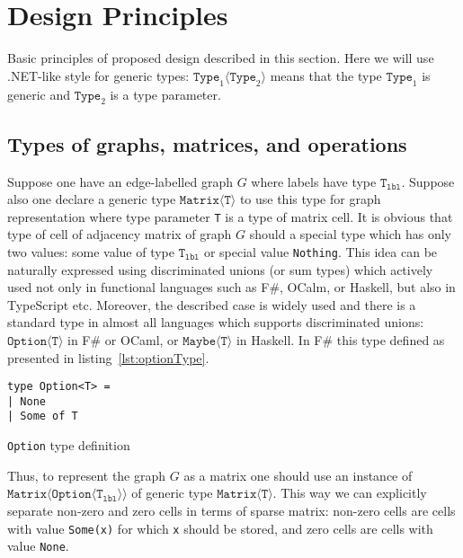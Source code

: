 \section{Design Principles}

Basic principles of proposed design described in this section.
Here we will use .NET-like style for generic types: $\texttt{Type}_1\langle\texttt{Type}_2\rangle$ means that the type $\texttt{Type}_1$ is generic and $\texttt{Type}_2$ is a type parameter.

\subsection{Types of graphs, matrices, and operations}

Suppose one have an edge-labelled graph $G$ where labels have type $\texttt{T}_{\texttt{lbl}}$. 
Suppose also one declare a generic type $\texttt{Matrix} \langle \texttt{T} \rangle$ to use this type for graph representation where type parameter \texttt{T} is a type of matrix cell. 
It is obvious that type of cell of adjacency matrix of graph $G$ should a special type which has only two values: some value of type $\texttt{T}_{\texttt{lbl}}$ or special value \texttt{Nothing}.
This idea can be naturally expressed using discriminated unions (or sum types) which actively used not only in functional languages such as F\#, OCalm, or Haskell, but also in TypeScript etc. 
Moreover, the described case is widely used and there is a standard type in almost all languages which supports discriminated unions: $\texttt{Option} \langle \texttt{T} \rangle$ in F\# or OCaml, or $\texttt{Maybe} \langle \texttt{T} \rangle$ in Haskell. 
In F\# this type defined as presented in listing~\ref{lst:optionType}.

\begin{listing}[h]
\begin{verbatim}
type Option<T> =
| None
| Some of T
\end{verbatim}
\caption{\texttt{Option} type definition}
\label{lst:optionType}
\end{listing}


Thus, to represent the graph $G$ as a matrix one should use an instance of $\texttt{Matrix} \langle \texttt{Option}\langle \texttt{T}_{\texttt{lbl}} \rangle \rangle $  of generic type $\texttt{Matrix}\langle \texttt{T} \rangle$.
This way we can explicitly separate non-zero and zero cells in terms of sparse matrix: non-zero cells are cells with value \texttt{Some(x)} for which \texttt{x} should be stored, and zero cells are cells with value \texttt{None}.

